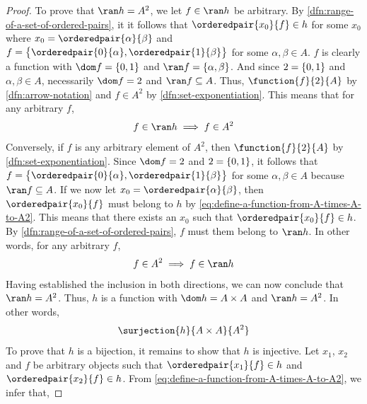 \begin{proof}
    \vspace{0.3cm}
    \noindent
    To prove that \( \ran h = A^{2} \), we let \( f \in \ran h \) be arbitrary.
    By \cref{dfn:range-of-a-set-of-ordered-pairs}, it it follows that \( \orderedpair{x_{0}}{f} \in h \)
    for some \( x_{0} \) where \( x_{0} = \orderedpair{\alpha}{\beta} \) and \( f = \big\{ \orderedpair{0}{\alpha},\orderedpair{1}{\beta} \big\} \)
    for some \( \alpha,\beta \in A \).
    \( f \) is clearly a function with \( \dom f = \mleft\{ 0,1 \mright\} \) and \( \ran f = \mleft\{ \alpha, \beta \mright\} \).
    And since \( 2 = \mleft\{ 0,1 \mright\} \) and \( \alpha,\beta \in A \), necessarily \( \dom f = 2 \) and \( \ran f \subseteq A \).
    Thus, \( \function{f}{2}{A} \) by \cref{dfn:arrow-notation} and \( f \in A^{2} \) by \cref{dfn:set-exponentiation}. This means that for any
    arbitrary \( f \),
    \begin{equation*}
        f \in \ran h \implies f \in A^{2}
    \end{equation*}
    Conversely, if \( f \) is any arbitrary element of \( A^{2} \), then \( \function{f}{2}{A} \) by \cref{dfn:set-exponentiation}.
    Since \( \dom f = 2 \) and \( 2 = \mleft\{ 0,1 \mright\} \), it follows that \( f = \big\{ \orderedpair{0}{\alpha},\orderedpair{1}{\beta} \big\} \)
    for some \( \alpha,\beta \in A \) because \( \ran f \subseteq A \). If we now let \( x_{0} = \orderedpair{\alpha}{\beta} \), then
    \( \orderedpair{x_{0}}{f} \) must belong to \( h \) by \eqref{eq:define-a-function-from-A-times-A-to-A2}.
    This means that there exists an \( x_{0} \) such that \( \orderedpair{x_{0}}{f} \in h \). By \cref{dfn:range-of-a-set-of-ordered-pairs},
    \( f \) must them belong to \( \ran h \). In other words, for any arbitrary \( f \),
    \begin{equation*}
        f \in A^{2} \implies f \in \ran h
    \end{equation*}
    Having established the inclusion in both directions, we can now conclude that \( \ran h = A^{2} \). Thus, \( h \) is a function with
    \( \dom h = A \times A \) and \( \ran h = A^{2} \). In other words,
    \begin{equation*}
        \surjection{h}{A \times A}{A^{2}}
    \end{equation*}
    To prove that \( h \) is a bijection, it remains to show that \( h \) is injective. Let \( x_{1} \), \( x_{2} \) and \( f \) be
    arbitrary objects such that \( \orderedpair{x_{1}}{f} \in h \) and \( \orderedpair{x_{2}}{f} \in h \).
    From \eqref{eq:define-a-function-from-A-times-A-to-A2}, we infer that,

\end{proof}
